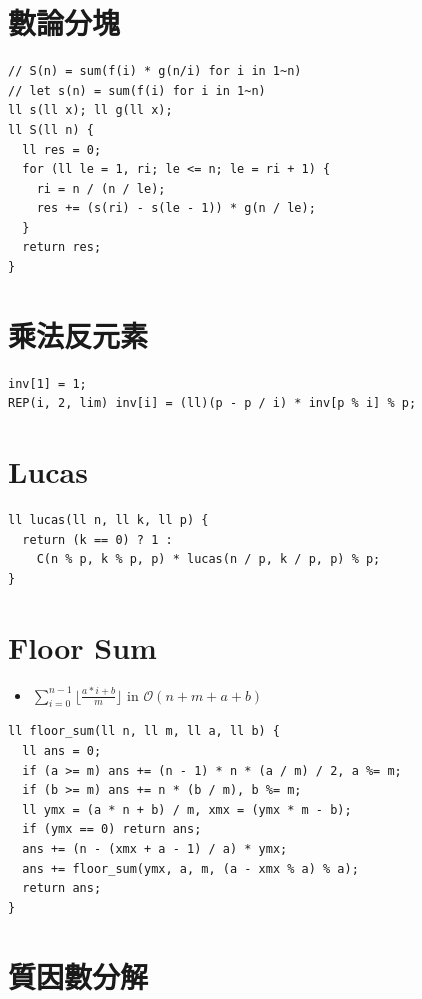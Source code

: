 \documentclass[10pt, a4paper, twocolumn]{article}
\begin{document}
\section{數論分塊}

\begin{verbatim}
// S(n) = sum(f(i) * g(n/i) for i in 1~n)
// let s(n) = sum(f(i) for i in 1~n)
ll s(ll x); ll g(ll x);
ll S(ll n) {
  ll res = 0;
  for (ll le = 1, ri; le <= n; le = ri + 1) {
    ri = n / (n / le);
    res += (s(ri) - s(le - 1)) * g(n / le);
  }
  return res;
}
\end{verbatim}

\section{乘法反元素}

\begin{verbatim}
inv[1] = 1;
REP(i, 2, lim) inv[i] = (ll)(p - p / i) * inv[p % i] % p;
\end{verbatim}

\section{Lucas}

\begin{verbatim}
ll lucas(ll n, ll k, ll p) {
  return (k == 0) ? 1 : 
    C(n % p, k % p, p) * lucas(n / p, k / p, p) % p;
}
\end{verbatim}

\section{Floor Sum}

\begin{itemize}[tight_item]
  \item $\sum^{n-1}_{i=0} \lfloor \frac{a * i + b}{m} \rfloor$ in $\mathcal{O}(n + m + a + b)$
\end{itemize}

\begin{verbatim}
ll floor_sum(ll n, ll m, ll a, ll b) {
  ll ans = 0;
  if (a >= m) ans += (n - 1) * n * (a / m) / 2, a %= m;
  if (b >= m) ans += n * (b / m), b %= m;
  ll ymx = (a * n + b) / m, xmx = (ymx * m - b);
  if (ymx == 0) return ans;
  ans += (n - (xmx + a - 1) / a) * ymx;
  ans += floor_sum(ymx, a, m, (a - xmx % a) % a);
  return ans;
}
\end{verbatim}

\section{質因數分解}
\end{document}
